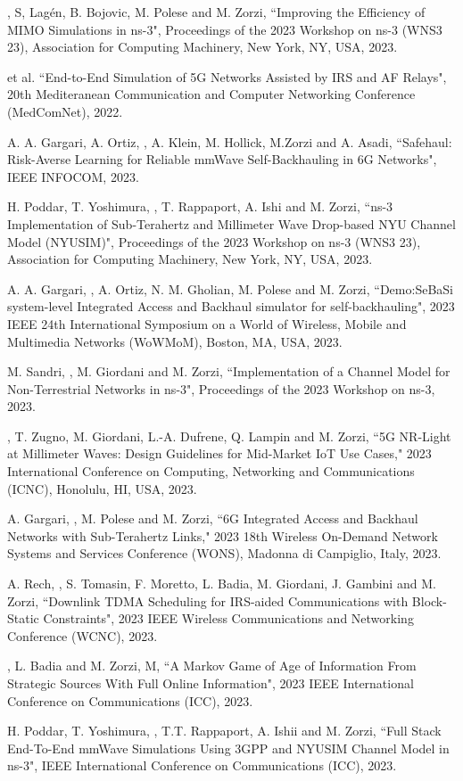 \begin{enumerate}[label={[C\arabic*]}]
    \item \myself, S, Lagén, B. Bojovic, M. Polese and M. Zorzi, ``Improving the Efficiency of MIMO Simulations in ns-3", Proceedings of the 2023 Workshop on ns-3 (WNS3 23), Association for Computing Machinery, New York, NY, USA, 2023.
    \item \myself{} et al. ``End-to-End Simulation of 5G Networks Assisted by IRS and AF Relays", 20th Mediteranean Communication and Computer Networking Conference (MedComNet), 2022.
    \item A. A. Gargari, A. Ortiz, \myself, A. Klein, M. Hollick, M.Zorzi and A. Asadi, ``Safehaul: Risk-Averse Learning for Reliable mmWave Self-Backhauling in 6G Networks", IEEE INFOCOM, 2023.
    \item H. Poddar, T. Yoshimura, \myself, T. Rappaport, A. Ishi and M. Zorzi, ``ns-3 Implementation of Sub-Terahertz and Millimeter Wave Drop-based NYU Channel Model (NYUSIM)", Proceedings of the 2023 Workshop on ns-3 (WNS3 23), Association for Computing Machinery, New York, NY, USA, 2023.
    \item A. A. Gargari, \myself, A. Ortiz, N. M. Gholian, M. Polese and M. Zorzi, ``Demo:SeBaSi system-level Integrated Access and Backhaul simulator for self-backhauling", 2023 IEEE 24th International Symposium on a World of Wireless, Mobile and Multimedia Networks (WoWMoM), Boston, MA, USA, 2023.
    \item M. Sandri, \myself, M. Giordani and M. Zorzi, ``Implementation of a Channel Model for Non-Terrestrial Networks in ns-3", Proceedings of the 2023 Workshop on ns-3, 2023.
    \item \myself, T. Zugno, M. Giordani, L.-A. Dufrene, Q. Lampin and M. Zorzi, ``5G NR-Light
    at Millimeter Waves: Design Guidelines for Mid-Market IoT Use Cases," 2023 International
    Conference on Computing, Networking and Communications (ICNC), Honolulu, HI, USA, 2023.
    \item A. Gargari, \myself, M. Polese and M. Zorzi, ``6G Integrated Access and Backhaul
    Networks with Sub-Terahertz Links," 2023 18th Wireless On-Demand Network Systems and
    Services Conference (WONS), Madonna di Campiglio, Italy, 2023.
    \item A. Rech, \myself, S. Tomasin, F. Moretto, L. Badia, M. Giordani, J. Gambini and M. Zorzi, ``Downlink TDMA Scheduling for IRS-aided Communications with Block-Static Constraints", 2023 IEEE Wireless Communications and Networking Conference (WCNC), 2023.
    \item \myself, L. Badia and M. Zorzi, M, ``A Markov Game of Age of Information From Strategic Sources With Full Online Information", 2023 IEEE International Conference on Communications (ICC), 2023.
    \item H. Poddar, T. Yoshimura, \myself, T.T. Rappaport, A. Ishii and M. Zorzi, ``Full Stack End-To-End mmWave Simulations Using 3GPP and NYUSIM Channel Model in ns-3", IEEE International Conference on Communications (ICC), 2023.
\end{enumerate}
